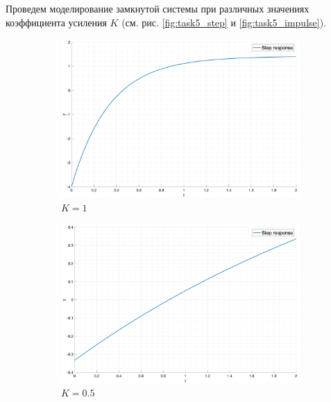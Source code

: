 Проведем моделирование замкнутой системы при различных значениях коэффициента усиления $K$ (см. рис. \ref{fig:task5_step} и \ref{fig:task5_impulse}).
\begin{figure}[ht!]
    \begin{subfigure}{0.5\textwidth}
        \centering
        \includegraphics[width=\textwidth]{media/plots/task5_step_response_closed_1.png}
        \caption{$K = 1$}
    \end{subfigure}
    \begin{subfigure}{0.5\textwidth}
        \centering
        \includegraphics[width=\textwidth]{media/plots/task5_step_response_closed_2.png}
        \caption{$K = 0.5$}
    \end{subfigure}
    \begin{subfigure}{0.5\textwidth}
        \centering

\end{subfigure}
\end{figure}
